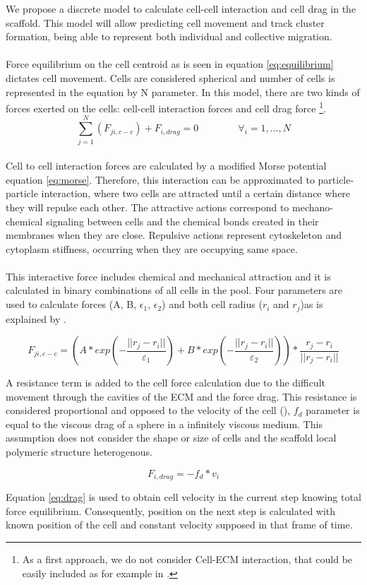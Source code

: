 We propose a discrete model to calculate cell-cell interaction and cell drag in the scaffold. This model will allow predicting cell movement and track cluster formation, being able to represent both individual and collective migration.\\
\\
Force equilibrium on the cell centroid as is seen in equation \eqref{eq:equilibrium} dictates cell movement. Cells are considered spherical and number of cells is represented in the equation by N parameter. In this model, there are two kinds of forces exerted on the cells: cell-cell interaction forces and cell drag force \footnote{As a first approach, we do not consider Cell-ECM interaction, that could be easily included as for example in \cite{Rey2013}.}. 
\\
\begin{equation}  \label{eq:equilibrium}
\sum\limits_{j=1}^N (F_{ji,c-c})+ F_{i, drag}=0 \qquad\qquad \forall_i=1,...,N
\end{equation}
\\
Cell to cell interaction forces are calculated by a modified Morse potential equation \eqref{eq:morse}. Therefore, this interaction can be approximated to particle-particle interaction, where two cells are attracted until a certain distance where they will repulse each other. The attractive actions correspond to mechano-chemical signaling between cells and the chemical bonds created in their membranes when they are close. Repulsive actions represent cytoskeleton and cytoplasm stiffness, occurring when they are occupying same space.\\
\\
This interactive force includes chemical and mechanical attraction and it is calculated in binary combinations of all cells in the pool. Four parameters are used to calculate forces (A, B, $\epsilon_1$, $\epsilon_2$) and both cell radius ($r_i$ and $r_j$)as is explained by \cite{Rey2013}.

\begin{equation}  \label{eq:morse}
F_{ji,c-c}=\left(A*exp\left( -\dfrac{||r_j-r_i||}{\varepsilon_1} \right) + B*exp\left( -\dfrac{||r_j-r_i||}{\varepsilon_2} \right) \right) * \dfrac{r_j-r_i}{||r_j-r_i||}
\end{equation}


A resistance term is added to the cell force calculation due to the difficult movement through the cavities of the ECM and the force drag. This resistance is considered proportional and opposed to the velocity of the cell (\cite{Zaman2005}), $f_d$ parameter is equal to the viscous drag of a sphere in a infinitely viscous medium. This assumption does not consider the shape or size of cells and the scaffold local polymeric structure heterogenous.

\begin{equation}  \label{eq:drag}
F_{i,drag}=-f_d*v_i 
\end{equation}

Equation \eqref{eq:drag} is used to obtain cell velocity in the current step knowing total force equilibrium. Consequently, position on the next step is calculated with known position of the cell and constant velocity supposed in that frame of time.

